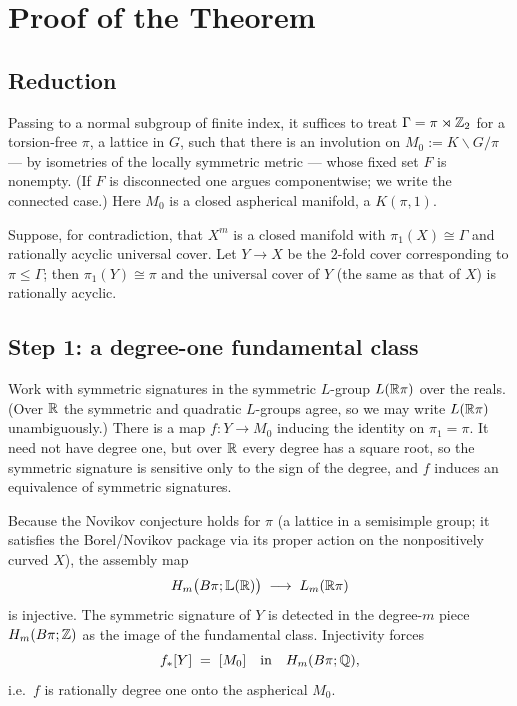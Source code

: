 \documentclass[11pt]{article}
\begin{document}
\section*{Proof of the Theorem}

\subsection*{Reduction}

Passing to a normal subgroup of finite index, it suffices to treat
$\Gamma=\pi\rtimes\mathbb{Z}_2$ for a torsion-free $\pi$, a lattice in $G$, such that
there is an involution on $M_0:=K\backslash G/\pi$ --- by isometries of the
locally symmetric metric --- whose fixed set $F$ is nonempty. (If $F$ is
disconnected one argues componentwise; we write the connected case.) Here $M_0$
is a closed aspherical manifold, a $K(\pi,1)$.

Suppose, for contradiction, that $X^m$ is a closed manifold with
$\pi_1(X)\cong\Gamma$ and rationally acyclic universal cover. Let $Y\to X$ be the
$2$-fold cover corresponding to $\pi\le\Gamma$; then $\pi_1(Y)\cong\pi$ and the
universal cover of $Y$ (the same as that of $X$) is rationally acyclic.

\subsection*{Step 1: a degree-one fundamental class}

Work with symmetric signatures in the symmetric $L$-group $L(\mathbb{R}\pi)$ over the
reals. (Over $\mathbb{R}$ the symmetric and quadratic $L$-groups agree, so we may write
$L(\mathbb{R}\pi)$ unambiguously.) There is a map $f:Y\to M_0$ inducing the identity on
$\pi_1=\pi$. It need not have degree one, but over $\mathbb{R}$ every degree has a square
root, so the symmetric signature is sensitive only to the sign of the degree,
and $f$ induces an equivalence of symmetric signatures.

Because the Novikov conjecture holds for $\pi$ (a lattice in a semisimple group;
it satisfies the Borel/Novikov package via its proper action on the
nonpositively curved $X$), the assembly map
\[
  H_m\bigl(B\pi;\mathbb{L}(\mathbb{R})\bigr)\;\longrightarrow\;L_m(\mathbb{R}\pi)
\]
is injective. The symmetric signature of $Y$ is detected in the degree-$m$ piece
$H_m(B\pi;\mathbb{Z})$ as the image of the fundamental class. Injectivity forces
\begin{equation}\label{eq:deg-one}
  f_*[Y]\;=\;[M_0]\quad\text{in}\quad H_m(B\pi;\mathbb{Q}),
\end{equation}
i.e.\ $f$ is rationally degree one onto the aspherical $M_0$.
\end{document}
